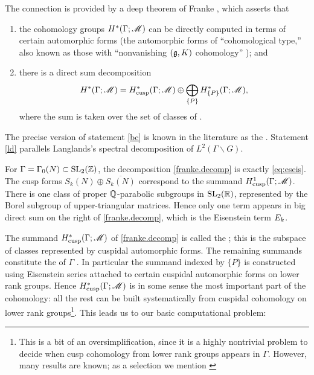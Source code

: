 The connection is provided by a deep theorem of Franke \cite{franke},
which asserts
that
\begin{enumerate}
\item the cohomology groups $H^{*} (\Gamma ; \mathscr M)$ can be directly
computed in terms of certain automorphic forms (the automorphic forms
of ``cohomological type,'' also known as those with ``nonvanishing
$(\mathfrak g , K)$ cohomology'' \cite{vog.zuck}); and \label{bc}
\item there is a direct sum decomposition 
\begin{equation}\label{franke.decomp}
H^{*} (\Gamma ; \mathscr M) = H^{*}_{\text{cusp}} (\Gamma ;
\mathscr M)\oplus\bigoplus_{\{P \}}H^{*}_{\{P \}} (\Gamma ; \mathscr M),
\end{equation}
where the sum is taken over the set of classes of . \label{ld}
\end{enumerate}
The precise version of statement \eqref{bc} is known in the literature
as the .  Statement \eqref{ld} parallels
Langlands's spectral decomposition of $L^{2} (\Gamma \backslash G)$.

\begin{example}
For $\Gamma = \Gamma_{0} (N)\subset \operatorname{SL}_{2} (\mathbb{Z})$, the decomposition
\eqref{franke.decomp} is exactly \eqref{eq:eseis}.  The cusp forms
$S_{k} (N)\oplus \overline{S_{k} (N)}$ correspond to the summand
$H^{1}_{\text{cusp}} (\Gamma ; \mathscr M)$.  There is one class of proper
$\mathbb{Q}$-parabolic subgroups in $\operatorname{SL}_{2} (\mathbb{R})$, represented by the Borel subgroup
of upper-triangular matrices.  Hence only one term appears in big
direct sum on the right of \eqref{franke.decomp}, which is the
Eisenstein term
$E_{k}$.
\end{example}


The summand $H^{*}_{\text{cusp}} (\Gamma ; \mathscr M)$ of
\eqref{franke.decomp} is called the ; this
is the subspace of classes represented by cuspidal automorphic forms.
The remaining summands constitute the  of
$\Gamma$ \cite{harder.icm}.  In particular the summand indexed by $\{P \}$ is
constructed using Eisenstein series attached to certain cuspidal
automorphic forms on lower rank groups.  Hence $H^{*}_{\text{cusp}}
(\Gamma ; \mathscr M)$ is in some sense the most important part of the
cohomology: all the rest can be built systematically from cuspidal
cohomology on lower rank groups\footnote{This is a bit of an
oversimplification, since it is a highly nontrivial problem to decide
when cusp cohomology from lower rank groups appears in $\Gamma$.
However, many results are known; as a selection we mention
\cite{harder.icm, harder.gl2, li.schwermer}}. This leads us to our
basic computational problem:

